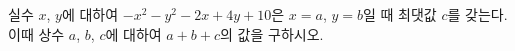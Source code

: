 실수 $x$, $y$에 대하여 $-x^2-y^2-2x+4y+10$은 $x=a$, $y=b$일 때 최댓값 $c$를 갖는다. 이때 상수 $a$, $b$, $c$에 대하여 $a+b+c$의 값을 구하시오.
